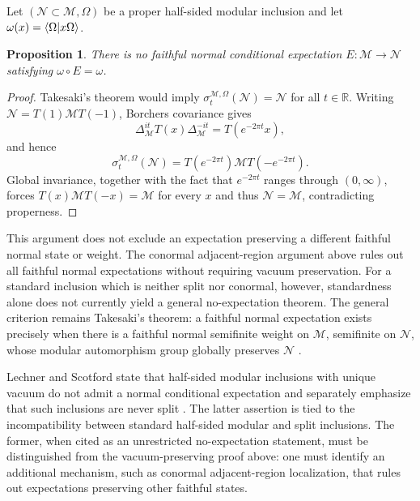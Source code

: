\documentclass[a4paper,11pt]{article}
\newtheorem{proposition}[theorem]{Proposition}
\theoremstyle{definition}
\begin{document}
Let $(\mathcal N\subset\mathcal M,\Omega)$ be a proper half-sided modular
inclusion and let $\omega(x)=\braket{\Omega|x\Omega}$.

\begin{proposition}\label{prop:no-vacuum-expectation}
There is no faithful normal conditional expectation
$E:\mathcal M\to\mathcal N$ satisfying $\omega\circ E=\omega$.
\end{proposition}

\begin{proof}
Takesaki's theorem would imply
$\sigma_t^{\mathcal M,\Omega}(\mathcal N)=\mathcal N$ for all $t\in\mathbb R$.
Writing $\mathcal N=T(1)\mathcal M T(-1)$, Borchers covariance gives
\begin{equation}
 \Delta_{\mathcal M}^{it}T(x)\Delta_{\mathcal M}^{-it}
 =T(e^{-2\pi t}x),
\end{equation}
and hence
\begin{equation}
 \sigma_t^{\mathcal M,\Omega}(\mathcal N)
 =T(e^{-2\pi t})\mathcal M T(-e^{-2\pi t}).
\end{equation}
Global invariance, together with the fact that $e^{-2\pi t}$ ranges through
$(0,\infty)$, forces $T(x)\mathcal M T(-x)=\mathcal M$ for every $x$ and thus
$\mathcal N=\mathcal M$, contradicting properness.
\end{proof}

This argument does not exclude an expectation preserving a different faithful
normal state or weight.  The conormal adjacent-region argument above rules out
all faithful normal expectations without requiring vacuum preservation.  For a
standard inclusion which is neither split nor conormal, however, standardness
alone does not currently yield a general no-expectation theorem.  The general
criterion remains Takesaki's theorem: a faithful normal expectation exists
precisely when there is a faithful normal semifinite weight on $\mathcal M$,
semifinite on $\mathcal N$, whose modular automorphism group globally preserves
$\mathcal N$ \cite{Takesaki1972}.

Lechner and Scotford state that half-sided modular inclusions with unique
vacuum do not admit a normal conditional expectation and separately emphasize
that such inclusions are never split \cite[Section~2]{LechnerScotford2022}.
The latter assertion is tied to the incompatibility between standard
half-sided modular and split inclusions.  The former, when cited as an
unrestricted no-expectation statement, must be distinguished from the
vacuum-preserving proof above: one must identify an additional mechanism, such
as conormal adjacent-region localization, that rules out expectations
preserving other faithful states.
\end{document}
